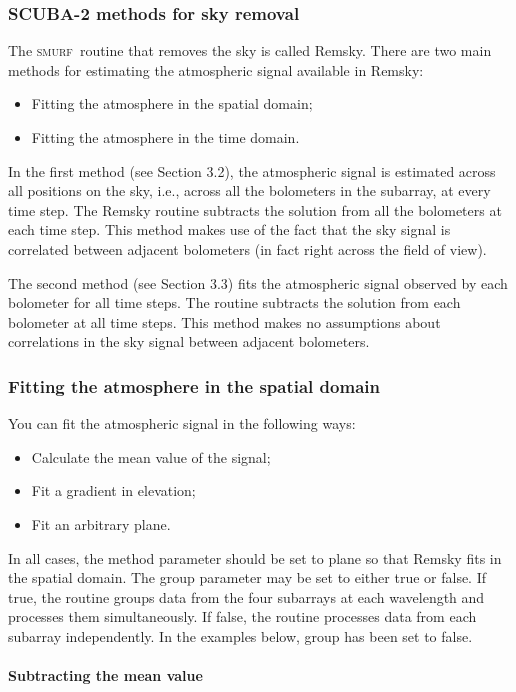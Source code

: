 \documentclass[twoside,11pt]{article}
\renewcommand{\_}{\texttt{\symbol{95}}}
\newcommand{\SMURF}{\textsc{smurf}}
\begin{document}
\subsubsection{SCUBA-2 methods for sky removal}

The \SMURF\ routine that removes the sky is called Remsky. There are two main
methods for estimating the atmospheric signal available in Remsky:
\begin{itemize}
\item Fitting the atmosphere in the spatial domain;
\item Fitting the atmosphere in the time domain.
\end{itemize}

In the first method (see Section 3.2), the atmospheric signal is
estimated across all positions on the sky, i.e., across all the
bolometers in the subarray, at every time step. The Remsky routine
subtracts the solution from all the bolometers at each time step. This
method makes use of the fact that the sky signal is correlated between
adjacent bolometers (in fact right across the field of view).

The second method (see Section 3.3) fits the atmospheric signal
observed by each bolometer for all time steps. The routine subtracts
the solution from each bolometer at all time steps. This method makes
no assumptions about correlations in the sky signal between adjacent
bolometers.

\subsubsection{Fitting the atmosphere in the spatial domain}

You can fit the atmospheric signal in the following ways:
\begin{itemize}
\item  Calculate the mean value of the signal;
\item  Fit a gradient in elevation;
\item  Fit an arbitrary plane.
\end{itemize}
In all cases, the method parameter should be set to plane so that
Remsky fits in the spatial domain. The group parameter may be set to
either true or false. If true, the routine groups data from the four
subarrays at each wavelength and processes them simultaneously. If
false, the routine processes data from each subarray independently. In
the examples below, group has been set to false.

\paragraph{Subtracting the mean value}
\end{document}
